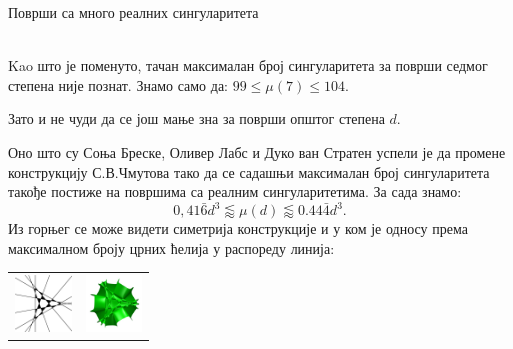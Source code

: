 ﻿\documentclass[en]{./../../common/SurferDesc}%
\begin{document}
\footnotesize




\begin{surferPage}
  \begin{surferTitle}Површи са много реалних сингуларитета\end{surferTitle}   \\
    Kao што је поменуто, тачан максималан број сингуларитета за површи 
	седмог степена није познат.
    Знамо само да: $99\le \mu(7) \le 104$. 


    Зато и не чуди да се још мање зна за површи општог степена  $d$. 

    Оно што су Соња Бреске, Оливер Лабс и Дуко ван Стратен успели је да промене 
	конструкцију С.В.Чмутова тако да се садашњи максималан број сингуларитета такође 
	постиже на површима са реалним сингуларитетима. 
    За сада знамо:
    \[0,41\bar{6}d^3 \lessapprox \mu(d) \lessapprox 0.44\bar{4} d^3.\]
     Из горњег се може видети симетрија конструкције и у ком је односу према максималном 
	 броју црних ћелија у распореду линија:
    \begin{center}
      \begin{tabular}{c@{\qquad}c}
        \includegraphics[height=1.5cm]{./../../common/images/vielesing.pdf}
        &
        \includegraphics[height=1.5cm]{./../../common/images/p9surface_von_oben}
      \end{tabular}
    \end{center}

  \begin{surferText}
     \end{surferText}
\end{surferPage}
\end{document}

